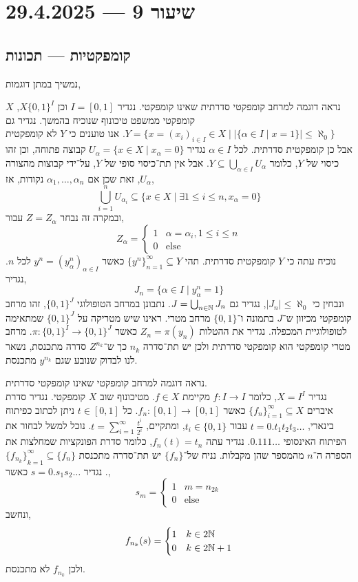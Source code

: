 \section{שיעור 9 --- 29.4.2025}
\subsection{קומפקטיות --- תכונות}
נמשיך במתן דוגמות,
\begin{example}
	נראה דוגמה למרחב קומפקטי סדרתית שאינו קומפקטי.
	נגדיר $I = [0, 1]$ וכן $X{\{0, 1\}}^I$, $X$ קומפקטי ממשפט טיכונוף שנוכיח בהמשך.
	נגדיר גם $Y = \{ x = {(x_i)}_{i \in I} \in X \mid |\{ \alpha \in I \mid x = 1\}| \le \aleph_0 \}$.
	אנו טוענים כי $Y$ לא קומפקטית אבל כן קומפקטית סדרתית.
	לכל $\alpha \in I$ נגדיר $U_{\alpha} = \{ x \in X \mid x_{\alpha} = 0 \}$ קבוצה פתוחה, וכן זהו כיסוי של $Y$, כלומר $Y \subseteq \bigcup_{\alpha \in I} U_{\alpha}$.
	אבל אין תת־כיסוי סופי של $Y$, על־ידי קבוצות מהצורה $U_{\alpha}$, זאת שכן אם $\alpha_1, \ldots, \alpha_n$ נקודות, אז,
	\[
		\bigcup_{i = 1}^n U_{\alpha_i}
		\subseteq \{ x \in X \mid \exists 1 \le i \le n, x_{\alpha} = 0 \}
	\]
	ובמקרה זה נבחר $Z = Z_{\alpha}$ עבור,
	\[
		Z_{\alpha} = \begin{cases}
			1 & \alpha = \alpha_i, 1 \le i \le n \\
			0 & \text{else}
		\end{cases}
	\]
	נוכיח עתה כי $Y$ קומפקטית סדרתית.
	תהי ${\{ y^n \}}_{n = 1}^\infty \subseteq Y$ כאשר $y^n = {( y_{\alpha}^n )}_{\alpha \in I}$ לכל $n$.
	נגדיר,
	\[
		J_n = \{ \alpha \in I \mid y_{\alpha}^n = 1 \}
	\]
	ונבחין כי $|J_n| \le \aleph_0$, נגדיר גם $J = \bigcup_{n \in \mathbb{N}} J_n$.
	נתבונן במרחב הטופולוגי ${\{0, 1\}}^J$, זהו מרחב קומפקטי מכיוון ש־$J$ בתמונה ו־$\{0, 1\}$ מרחב מטרי.
	ראינו שיש מטריקה על ${\{0, 1\}}^J$ שמתאימה לטופולוגיית המכפלה.
	נגדיר את ההטלות $Z_n = \pi(y_n)$ כאשר $\pi : {\{0, 1\}}^I \to {\{0, 1\}}^J$.
	מרחב מטרי קומפקטי הוא קומפקטי סדרתית ולכן יש תת־סדרה $n_k$ כך ש־$Z^{n_k}$ סדרה מתכנסת,
	נשאר לנו לבדוק שנובע שגם $y^{n_k}$ מתכנסת.
\end{example}
\begin{example}
	נראה דוגמה למרחב קומפקטי שאינו קומפקטי סדרתית. \\
	נגדיר $X = I^I$, כלומר $f : I \to I$ מקיימת $f \in X$.
	מטיכונוף שוב $X$ קומפקטי.
	נגדיר סדרת איברים ${\{ f_n \}}_{i = 1}^\infty \subseteq X$ כאשר $f_n : [0, 1] \to [0, 1]$.
	כל $t \in [0, 1]$ ניתן לכתוב כפיתוח בינארי, $t = 0. t_1 t_2 t_3 \ldots$ עבור $t_i \in \{0, 1\}$, ומתקיים, $t = \sum_{i = 1}^\infty \frac{t^i}{2^i}$.
	נוכל למשל לבחור את הפיתוח האינסופי $0.111\ldots$.
	נגדיר עתה $f_n(t) = t_n$, כלומר סדרת הפונקציות שמחלצות את הספרה ה־$n$ מהמספר שהן מקבלות.
	נניח של־$\{ f_n \}$ יש תת־סדרה מתכנסת $\{ {f_{n_k} \}}_{k = 1}^\infty \subseteq \{ f_n \}$.
	נגדיר $s = 0. s_1 s_2 \ldots$ כאשר,
	\[
		s_m
		= \begin{cases}
			1 & m = n_{2k} \\
			0 & \text{else}
		\end{cases}
	\]
	ונחשב,
	\[
		f_{n_k}(s)
		= \begin{cases}
			1 & k \in 2\mathbb{N} \\
			0 & k \in 2\mathbb{N} + 1
		\end{cases}
	\]
	ולכן $f_{n_k}$ לא מתכנסת.
\end{example}
